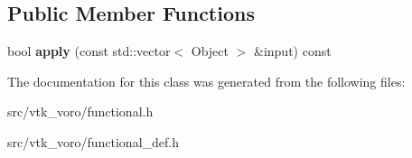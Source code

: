 \subsection*{Public Member Functions}
\begin{DoxyCompactItemize}
\item 
bool {\bfseries apply} (const std\+::vector$<$ Object $>$ \&input) const \hypertarget{classtools_1_1Predicates_1_1IS__NOT__EMPTY__VECTOR_a37ef88d9c0f1cc17f7dac1e8578905b9}{}\label{classtools_1_1Predicates_1_1IS__NOT__EMPTY__VECTOR_a37ef88d9c0f1cc17f7dac1e8578905b9}

\end{DoxyCompactItemize}


The documentation for this class was generated from the following files\+:\begin{DoxyCompactItemize}
\item 
src/vtk\+\_\+voro/functional.\+h\item 
src/vtk\+\_\+voro/functional\+\_\+def.\+h\end{DoxyCompactItemize}
